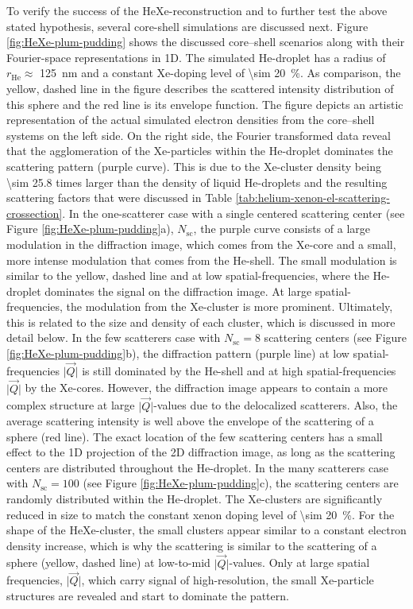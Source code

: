 To verify the success of the HeXe-reconstruction and to further test the above stated hypothesis, several core-shell simulations are discussed next. Figure \ref{fig:HeXe-plum-pudding} shows the discussed core--shell scenarios along with their Fourier-space representations in 1D. The simulated He-droplet has a radius of $r_{\text{He}}\approx$ \SI{125}{\nano\meter} and a constant Xe-doping level of \SI{\sim 20}{\percent}. As comparison, the yellow, dashed line in the figure describes the scattered intensity distribution of this sphere and the red line is its envelope function. The figure depicts an artistic representation of the actual simulated electron densities from the core--shell systems on the left side. On the right side, the Fourier transformed data reveal that the agglomeration of the Xe-particles within the He-droplet dominates the scattering pattern (purple curve). This is due to the Xe-cluster density being \num{\sim 25.8} times larger than the density of liquid He-droplets and the resulting scattering factors that were discussed in Table \ref{tab:helium-xenon-el-scattering-crossection}. In the one-scatterer case with a single centered scattering center (see Figure \ref{fig:HeXe-plum-pudding}a), $N_{\text{sc}}$, the purple curve consists of a large modulation in the diffraction image, which comes from the Xe-core and a small, more intense modulation that comes from the He-shell. The small modulation is similar to the yellow, dashed line and at low spatial-frequencies, where the He-droplet dominates the signal on the diffraction image. At large spatial-frequencies, the modulation from the Xe-cluster is more prominent. Ultimately, this is related to the size and density of each cluster, which is discussed in more detail below. In the few scatterers case with $N_{\text{sc}}=8$ scattering centers (see Figure \ref{fig:HeXe-plum-pudding}b), the diffraction pattern (purple line) at low spatial-frequencies $\lvert\vec{Q}\rvert$ is still dominated by the He-shell and at high spatial-frequencies $\lvert\vec{Q}\rvert$ by the Xe-cores. However, the diffraction image appears to contain a more complex structure at large $\lvert\vec{Q}\rvert$-values due to the delocalized scatterers. Also, the average scattering intensity is well above the envelope of the scattering of a sphere (red line). The exact location of the few scattering centers has a small effect to the 1D projection of the 2D diffraction image, as long as the scattering centers are distributed throughout the He-droplet. In the many scatterers case with $N_{\text{sc}}=100$ (see Figure \ref{fig:HeXe-plum-pudding}c), the scattering centers are randomly distributed within the He-droplet. The Xe-clusters are significantly reduced in size to match the constant xenon doping level of \SI{\sim 20}{\percent}. For the shape of the HeXe-cluster, the small clusters appear similar to a constant electron density increase, which is why the scattering is similar to the scattering of a sphere (yellow, dashed line) at low-to-mid $\lvert\vec{Q}\rvert$-values. Only at large spatial frequencies, $\lvert\vec{Q}\rvert$, which carry signal of high-resolution, the small Xe-particle structures are revealed and start to dominate the pattern.\\[1\baselineskip]
